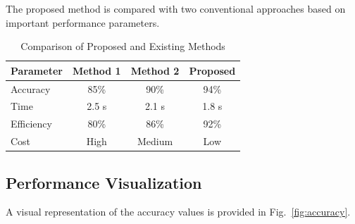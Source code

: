\documentclass[conference]{IEEEtran}
\begin{document}
The proposed method is compared with two conventional
approaches based on important performance parameters.

\begin{table}[H]

\centering

\caption{Comparison of Proposed and Existing Methods}

\label{tab:comparison}

\begin{tabular}{lccc}

\toprule

Parameter & Method 1 & Method 2 & Proposed \\

\midrule

Accuracy & 85\% & 90\% & 94\% \\

Time & 2.5 s & 2.1 s & 1.8 s \\

Efficiency & 80\% & 86\% & 92\% \\

Cost & High & Medium & Low \\

\bottomrule

\end{tabular}

\end{table}


\subsection{Performance Visualization}

A visual representation of the accuracy values is
provided in Fig.~\ref{fig:accuracy}.
\end{document}
